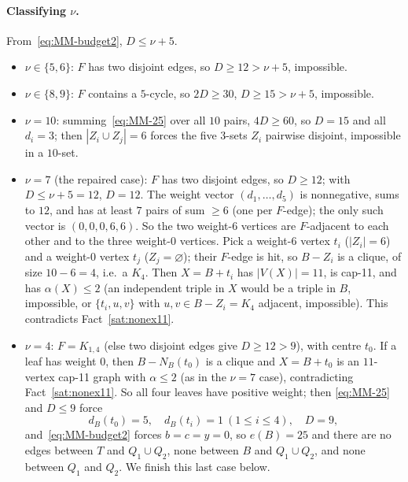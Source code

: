 \documentclass[11pt,reqno]{amsart}
\theoremstyle{definition}
\theoremstyle{remark}
\newcommand{\abs}[1]{\left|#1\right|}
\newcommand{\capeleven}{\textsf{cap-11}}
\begin{document}
\paragraph{Classifying $\nu$.}
From~\eqref{eq:MM-budget2}, $D\le\nu+5$.
\begin{itemize}[nosep]
\item $\nu\in\{5,6\}$: $F$ has two disjoint edges, so $D\ge 12>\nu+5$, impossible.
\item $\nu\in\{8,9\}$: $F$ contains a $5$-cycle, so $2D\ge 30$, $D\ge 15>\nu+5$,
impossible.
\item $\nu=10$: summing~\eqref{eq:MM-25} over all $10$ pairs, $4D\ge 60$, so $D=15$
and all $d_i=3$; then $\abs{Z_i\cup Z_j}=6$ forces the five $3$-sets $Z_i$ pairwise
disjoint, impossible in a $10$-set.
\item $\nu=7$ \textup{(the repaired case)}: $F$ has two disjoint edges, so $D\ge 12$;
with $D\le\nu+5=12$, $D=12$. The weight vector $(d_1,\dots,d_5)$ is nonnegative,
sums to $12$, and has at least $7$ pairs of sum $\ge 6$ (one per $F$-edge); the only
such vector is $(0,0,0,6,6)$. So the two weight-$6$ vertices are $F$-adjacent to each
other and to the three weight-$0$ vertices. Pick a weight-$6$ vertex $t_i$
($\abs{Z_i}=6$) and a weight-$0$ vertex $t_j$ ($Z_j=\varnothing$); their $F$-edge is
hit, so $B-Z_i$ is a clique, of size $10-6=4$, i.e.\ a $K_4$. Then $X=B+t_i$ has
$\abs{V(X)}=11$, is \capeleven, and has $\alpha(X)\le 2$ (an independent triple in
$X$ would be a triple in $B$, impossible, or $\{t_i,u,v\}$ with $u,v\in B-Z_i=K_4$
adjacent, impossible). This contradicts Fact~\ref{sat:nonex11}.
\item $\nu=4$: $F=K_{1,4}$ (else two disjoint edges give $D\ge 12>9$), with centre
$t_0$. If a leaf has weight $0$, then $B-N_B(t_0)$ is a clique and $X=B+t_0$ is an
$11$-vertex \capeleven{} graph with $\alpha\le 2$ (as in the $\nu=7$ case),
contradicting Fact~\ref{sat:nonex11}. So all four leaves have positive weight; then
\eqref{eq:MM-25} and $D\le 9$ force
\[
  d_B(t_0)=5,\quad d_B(t_i)=1\ (1\le i\le 4),\quad D=9,
\]
and~\eqref{eq:MM-budget2} forces $b=c=y=0$, so $e(B)=25$ and there are no edges
between $T$ and $Q_1\cup Q_2$, none between $B$ and $Q_1\cup Q_2$, and none between
$Q_1$ and $Q_2$. We finish this last case below.
\end{itemize}
\end{document}
